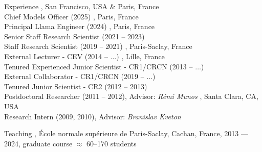 \documentclass{resume}
\begin{document}
\maketitle




\begin{category}{Experience}
, San Francisco, USA \& Paris, France\\
Chief Models Officer (2025) 
, Paris, France \\
Principal Llama Engineer (2024) 
, Paris, France \\
Senior Staff Research Scientist (2021 -- 2023) \\
Staff Research Scientist (2019 -- 2021) 
, Paris-Saclay, France \\
External Lecturer - CEV (2014 -- $\dots$)
, Lille, France \\
Tenured Experienced Junior Scientist - CR1/CRCN (2013 -- $\dots$) \\
External Collaborator - CR1/CRCN (2019 -- $\dots$)  \\
Tenured Junior Scientist - CR2 (2012 -- 2013)  \\
Postdoctoral Researcher (2011 -- 2012), Advisor:  \emph{R\'emi Munos}
,  Santa Clara, CA, USA\\
Research Intern (2009, 2010), Advisor:  \emph{Branislav Kveton}
\begin{category}{Teaching}
,  %
\' Ecole normale sup\' erieure de Paris-Saclay, Cachan, France, 
2013 --- 2024,  graduate course $\approx$ 60--170 students
\end{category}
\end{category}
\end{document}
